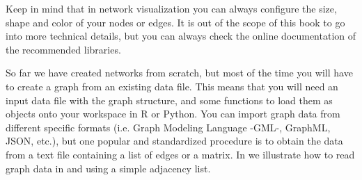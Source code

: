 
Keep in mind that in network visualization you can always configure the size, shape and color of your nodes or edges. It is out of the scope of this book to go into more technical details, but you can always check the online documentation of the recommended libraries.

So far we have created networks from scratch, but most of the time you will have to create a graph from an existing data file. This means that you will need an input data file with the graph structure, and some functions to load them as objects onto your workspace in R or Python. You can import graph data from different specific formats (i.e. Graph Modeling Language -GML-, GraphML, JSON, etc.), but one popular and standardized procedure is to obtain the data from a text file containing a list of edges or a matrix. In   we illustrate how to read graph data in  and  using a simple adjacency list.


